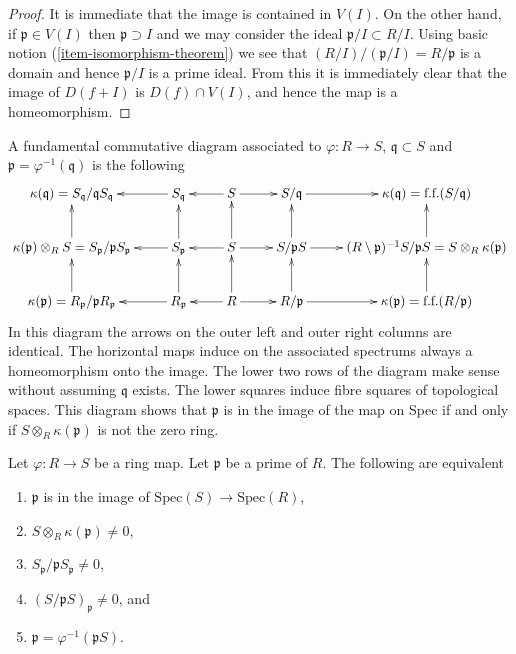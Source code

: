 \begin{proof}
It is immediate that the image is contained in $V(I)$.
On the other hand, if $\mathfrak p \in V(I)$
then $\mathfrak p \supset I$ and we may consider
the ideal $\mathfrak p /I \subset R/I$. Using
basic notion (\ref{item-isomorphism-theorem}) we see that
$(R/I)/(\mathfrak p/I) = R/\mathfrak p$ is a domain
and hence $\mathfrak p/I$ is a prime ideal. From this
it is immediately clear that the image of $D(f + I)$
is $D(f) \cap V(I)$, and hence the map is a homeomorphism.
\end{proof}



\begin{remark}
\label{remark-fundamental-diagram}
A fundamental commutative diagram associated to
$\varphi : R \to S$,
$\mathfrak q \subset S$ and
$\mathfrak p = \varphi^{-1}(\mathfrak q)$ is
the following
$$
\xymatrix{
\kappa(\mathfrak q) = S_{\mathfrak q}/{\mathfrak q}S_{\mathfrak q}
&
S_{\mathfrak q} \ar[l]
&
S \ar[r] \ar[l]
&
S/\mathfrak q \ar[r]
&
\kappa(\mathfrak q) = \text{f.f.}(S/\mathfrak q)
\\
\kappa(\mathfrak p) \otimes_R S =
S_{\mathfrak p}/{\mathfrak p}S_{\mathfrak p} \ar[u]
&
S_{\mathfrak p} \ar[u] \ar[l]
&
S \ar[u] \ar[r] \ar[l]
&
S/\mathfrak pS \ar[u] \ar[r]
&
(R \setminus \mathfrak p)^{-1}S/\mathfrak pS =
S \otimes_R \kappa(\mathfrak p) \ar[u]
\\
\kappa(\mathfrak p) =
R_{\mathfrak p}/{\mathfrak p}R_{\mathfrak p} \ar[u]
&
R_{\mathfrak p} \ar[u] \ar[l]
&
R \ar[u] \ar[r] \ar[l]
&
R/\mathfrak p \ar[u] \ar[r]
&
\kappa(\mathfrak p) = \text{f.f.}(R/\mathfrak p) \ar[u]
}
$$
In this diagram the arrows on the outer left and outer right columns
are identical. The horizontal maps induce on the associated spectrums
always a homeomorphism onto the image. The lower two rows
of the diagram make sense without assuming $\mathfrak q$ exists.
The lower squares induce fibre squares of topological spaces.
This diagram shows that $\mathfrak p$ is in the image
of the map on Spec if and only if $S \otimes_R \kappa(\mathfrak p)$
is not the zero ring.
\end{remark}

\begin{lemma}
\label{lemma-in-image}
Let $\varphi : R \to S$ be a ring map. Let $\mathfrak p$
be a prime of $R$. The following are equivalent
\begin{enumerate}
\item $\mathfrak p$ is in the image of
$\text{Spec}(S) \to \text{Spec}(R)$,
\item $S \otimes_R \kappa(\mathfrak p) \not= 0$,
\item $S_{\mathfrak p}/\mathfrak p S_{\mathfrak p} \not = 0$,
\item $(S/\mathfrak pS)_{\mathfrak p} \not = 0$, and
\item $\mathfrak p = \varphi^{-1}(\mathfrak pS)$.
\end{enumerate}
\end{lemma}


